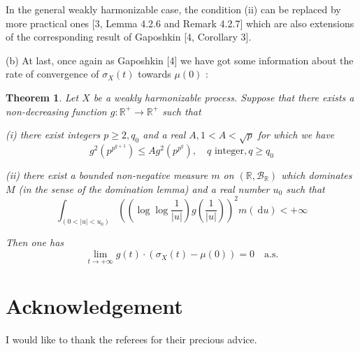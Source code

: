 \documentclass{article}
\newtheorem{theorem}{Theorem}
\theoremstyle{definition}
\begin{document}
In the general weakly harmonizable case, the condition (ii) can be replaced by more practical ones [3, Lemma 4.2.6 and Remark 4.2.7] which are also extensions of the corresponding result of Gaposhkin [4, Corollary 3].

(b) At last, once again as Gaposhkin [4] we have got some information about the rate of convergence of $\sigma_{X}(t)$ towards $\mu(0)$ :

\begin{theorem}\label{thm:4}
Let $X$ be a weakly harmonizable process. Suppose that there exists a non-decreasing function $g: \mathbb{R}^{+} \rightarrow \mathbb{R}^{+}$ such that

(i) there exist integers $p \geqslant 2, q_{0}$ and a real $A, 1<A<\sqrt{p}$ for which we have
\begin{equation}\label{eq:45}
g^{2}\left(p^{p^{q+1}}\right) \leqslant A g^{2}\left(p^{p^{q}}\right), \quad q \text{ integer}, q \geqslant q_{0}
\end{equation}

(ii) there exist a bounded non-negative measure $m$ on $(\mathbb{R}, \mathscr{B}_{\mathbb{R}})$ which dominates $M$ (in the sense of the domination lemma) and a real number $u_{0}$ such that
\begin{equation}\label{eq:46}
\int_{\left(0<|u|<u_{0}\right)}\left(\left(\log \log \frac{1}{|u|}\right) g\left(\frac{1}{|u|}\right)\right)^{2} m(\mathrm{~d} u)<+\infty
\end{equation}

Then one has
\begin{equation}\label{eq:47}
\lim_{t \rightarrow+\infty} g(t) \cdot\left(\sigma_{X}(t)-\mu(0)\right)=0 \quad \text{a.s.}
\end{equation}
\end{theorem}

\section*{Acknowledgement}

I would like to thank the referees for their precious advice.
\end{document}
